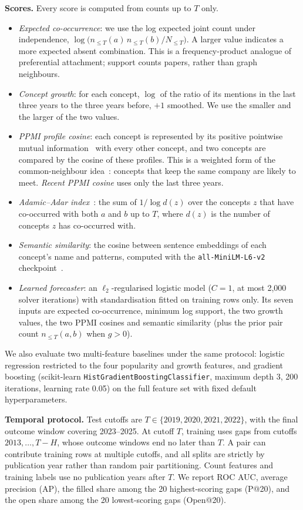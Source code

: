 \documentclass[runningheads]{llncs}
\begin{document}
\textbf{Scores.} Every score is computed from counts up to $T$ only.
\begin{itemize}
\item \emph{Expected co-occurrence}: we use the log expected joint count under independence, $\log\big(n_{\le T}(a)\,n_{\le T}(b)/N_{\le T}\big)$. A larger value indicates a more expected absent combination. This is a frequency-product analogue of preferential attachment; support counts papers, rather than graph neighbours.
\item \emph{Concept growth}: for each concept, $\log$ of the ratio of its mentions in the last three years to the three years before, $+1$ smoothed. We use the smaller and the larger of the two values.
\item \emph{PPMI profile cosine}: each concept is represented by its positive pointwise mutual information~\cite{church1990word} with every other concept, and two concepts are compared by the cosine of these profiles. This is a weighted form of the common-neighbour idea~\cite{adamic2003friends}: concepts that keep the same company are likely to meet. \emph{Recent PPMI cosine} uses only the last three years.
\item \emph{Adamic--Adar index}~\cite{adamic2003friends}: the sum of $1/\log d(z)$ over the concepts $z$ that have co-occurred with both $a$ and $b$ up to $T$, where $d(z)$ is the number of concepts $z$ has co-occurred with.
\item \emph{Semantic similarity}: the cosine between sentence embeddings of each concept's name and patterns, computed with the \texttt{all-MiniLM-L6-v2} checkpoint~\cite{reimers2019sentence}.
\item \emph{Learned forecaster}: an $\ell_2$-regularised logistic model ($C{=}1$, at most 2,000 solver iterations) with standardisation fitted on training rows only. Its seven inputs are expected co-occurrence, minimum log support, the two growth values, the two PPMI cosines and semantic similarity (plus the prior pair count $n_{\le T}(a,b)$ when $g{>}0$).
\end{itemize}
We also evaluate two multi-feature baselines under the same protocol: logistic regression restricted to the four popularity and growth features, and gradient boosting (scikit-learn \texttt{HistGradientBoostingClassifier}, maximum depth 3, 200 iterations, learning rate 0.05) on the full feature set with fixed default hyperparameters.

\textbf{Temporal protocol.} Test cutoffs are $T\in\{2019,2020,2021,2022\}$, with the final outcome window covering 2023--2025. At cutoff $T$, training uses gaps from cutoffs $2013,\dots,T-H$, whose outcome windows end no later than $T$. A pair can contribute training rows at multiple cutoffs, and all splits are strictly by publication year rather than random pair partitioning. Count features and training labels use no publication years after $T$. We report ROC AUC, average precision (AP), the filled share among the 20 highest-scoring gaps (P@20), and the open share among the 20 lowest-scoring gaps (Open@20).
\end{document}
